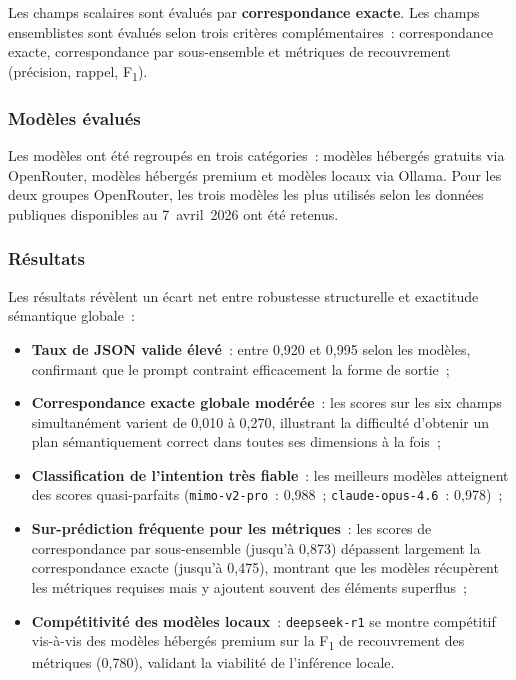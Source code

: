 Les champs scalaires sont évalués par \textbf{correspondance exacte}. Les champs ensemblistes
sont évalués selon trois critères complémentaires~: correspondance exacte, correspondance par
sous-ensemble et métriques de recouvrement (précision, rappel, F\textsubscript{1}).

\subsubsection*{Modèles évalués}

Les modèles ont été regroupés en trois catégories~: modèles hébergés gratuits via OpenRouter,
modèles hébergés premium et modèles locaux via Ollama. Pour les deux groupes OpenRouter, les
trois modèles les plus utilisés selon les données publiques disponibles au 7~avril~2026 ont
été retenus.

\subsubsection*{Résultats}

Les résultats révèlent un écart net entre robustesse structurelle et exactitude sémantique
globale~:

\begin{itemize}
    \item \textbf{Taux de JSON valide élevé}~: entre 0,920 et 0,995 selon les modèles, confirmant
          que le prompt contraint efficacement la forme de sortie~;
    \item \textbf{Correspondance exacte globale modérée}~: les scores sur les six champs
          simultanément varient de 0,010 à 0,270, illustrant la difficulté d'obtenir un plan
          sémantiquement correct dans toutes ses dimensions à la fois~;
    \item \textbf{Classification de l'intention très fiable}~: les meilleurs modèles atteignent
          des scores quasi-parfaits (\texttt{mimo-v2-pro}~: 0,988~;
          \texttt{claude-opus-4.6}~: 0,978)~;
    \item \textbf{Sur-prédiction fréquente pour les métriques}~: les scores de correspondance par
          sous-ensemble (jusqu'à 0,873) dépassent largement la correspondance exacte (jusqu'à
          0,475), montrant que les modèles récupèrent les métriques requises mais y ajoutent
          souvent des éléments superflus~;
    \item \textbf{Compétitivité des modèles locaux}~: \texttt{deepseek-r1} se montre compétitif
          vis-à-vis des modèles hébergés premium sur la F\textsubscript{1} de recouvrement des
          métriques (0,780), validant la viabilité de l'inférence locale.
\end{itemize}

